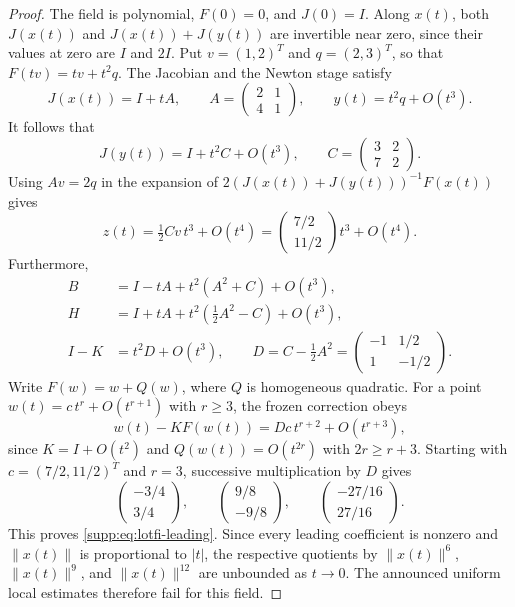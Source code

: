 \documentclass[11pt,a4paper]{article}
\numberwithin{equation}{section}
\numberwithin{table}{section}
\theoremstyle{plain}
\theoremstyle{definition}\newtheorem{definition}[theorem]{Definition}
\theoremstyle{remark}\newtheorem{remark}[theorem]{Remark}
\begin{document}
\begin{proof}
The field is polynomial, $F(0)=0$, and $J(0)=I$.
Along $x(t)$, both $J(x(t))$ and $J(x(t))+J(y(t))$ are invertible
near zero, since their values at zero are $I$ and $2I$.
Put $v=(1,2)^T$ and $q=(2,3)^T$, so that
$F(tv)=tv+t^2q$. The Jacobian and the Newton stage satisfy
\[
 J(x(t))=I+tA,\qquad
 A=\begin{pmatrix}2&1\\4&1\end{pmatrix},\qquad
 y(t)=t^2q+O(t^3).
\]
It follows that
\[
 J(y(t))=I+t^2C+O(t^3),\qquad
 C=\begin{pmatrix}3&2\\7&2\end{pmatrix}.
\]
Using $Av=2q$ in the expansion of
$2(J(x(t))+J(y(t)))^{-1}F(x(t))$ gives
\[
 z(t)=\tfrac12 Cv\,t^3+O(t^4)
     =\begin{pmatrix}7/2\\11/2\end{pmatrix}t^3+O(t^4).
\]
Furthermore,
\[
\begin{aligned}
 B&=I-tA+t^2(A^2+C)+O(t^3),\\
 H&=I+tA+t^2(\tfrac12 A^2-C)+O(t^3),\\
 I-K&=t^2D+O(t^3),\qquad
 D=C-\tfrac12 A^2=\begin{pmatrix}-1&1/2\\1&-1/2\end{pmatrix}.
\end{aligned}
\]
Write $F(w)=w+Q(w)$, where $Q$ is homogeneous quadratic.
For a point $w(t)=c\,t^r+O(t^{r+1})$ with $r\geq3$, the frozen
correction obeys
\[
 w(t)-KF(w(t))=Dc\,t^{r+2}+O(t^{r+3}),
\]
since $K=I+O(t^2)$ and $Q(w(t))=O(t^{2r})$ with $2r\geq r+3$.
Starting with $c=(7/2,11/2)^T$ and $r=3$, successive multiplication
by $D$ gives
\[
 \begin{pmatrix}-3/4\\3/4\end{pmatrix},\qquad
 \begin{pmatrix}9/8\\-9/8\end{pmatrix},\qquad
 \begin{pmatrix}-27/16\\27/16\end{pmatrix}.
\]
This proves \eqref{supp:eq:lotfi-leading}. Since every leading
coefficient is nonzero and $\|x(t)\|$ is proportional to $|t|$,
the respective quotients by $\|x(t)\|^6$, $\|x(t)\|^9$, and
$\|x(t)\|^{12}$ are unbounded as $t\to0$. The announced uniform
local estimates therefore fail for this field.
\end{proof}
\end{document}
